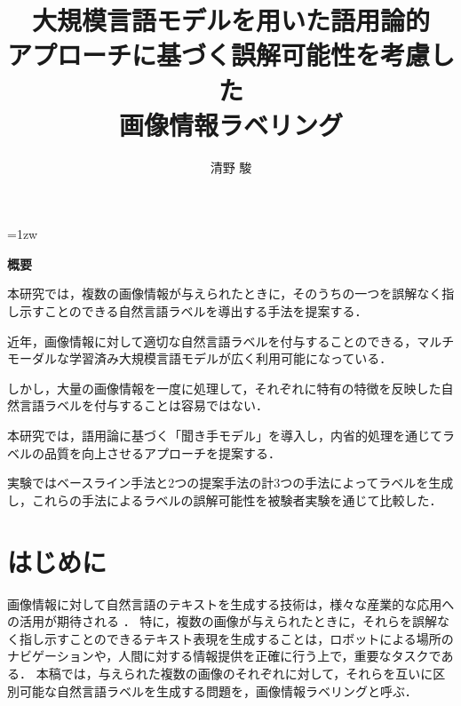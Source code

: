 \documentclass[a4paper,11pt]{jreport}
\title{大規模言語モデルを用いた語用論的\\アプローチに基づく誤解可能性を考慮した\\画像情報ラベリング}
\author{清野 駿}
\begin{document}
\maketitle
\thispagestyle{empty}
\newpage

\thispagestyle{empty}
\vspace*{20pt plus 1fil}
\parindent=1zw
\noindent
\begin{center}
{\bf 概要}
\vspace{5mm}
\end{center}
本研究では，複数の画像情報が与えられたときに，そのうちの一つを誤解なく指し示すことのできる自然言語ラベルを導出する手法を提案する．

近年，画像情報に対して適切な自然言語ラベルを付与することのできる，マルチモーダルな学習済み大規模言語モデルが広く利用可能になっている．

しかし，大量の画像情報を一度に処理して，それぞれに特有の特徴を反映した自然言語ラベルを付与することは容易ではない．

本研究では，語用論に基づく「聞き手モデル」を導入し，内省的処理を通じてラベルの品質を向上させるアプローチを提案する．


実験ではベースライン手法と2つの提案手法の計3つの手法によってラベルを生成し，これらの手法によるラベルの誤解可能性を被験者実験を通じて比較した．
\par
\vspace{0pt plus 1fil}
\newpage

\tableofcontents
\listoffigures

\pagebreak \setcounter{page}{1}


\chapter{はじめに}

画像情報に対して自然言語のテキストを生成する技術は，様々な産業的な応用への活用が期待される \cite{Yin2023}．
特に，複数の画像が与えられたときに，それらを誤解なく指し示すことのできるテキスト表現を生成することは，ロボットによる場所のナビゲーションや，人間に対する情報提供を正確に行う上で，重要なタスクである．
本稿では，与えられた複数の画像のそれぞれに対して，それらを互いに区別可能な自然言語ラベルを生成する問題を，画像情報ラベリングと呼ぶ．
\end{document}
